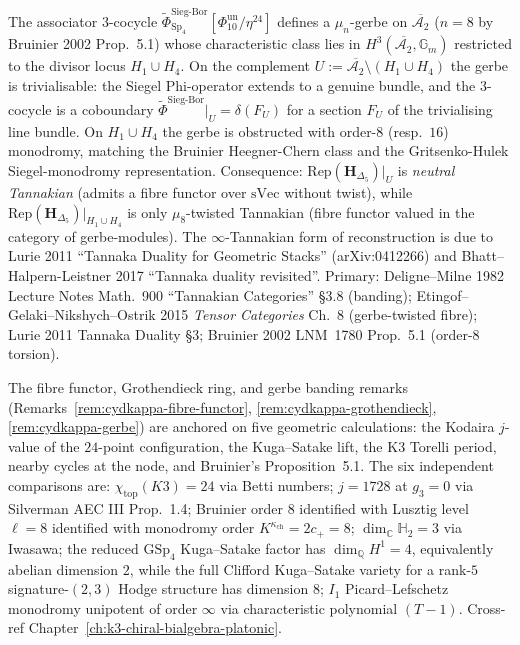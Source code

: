 \begin{remark}
\label{rem:cydkappa-gerbe}
The associator $3$-cocycle
$\widetilde{\Phi}^{\mathrm{Sieg\text{-}Bor}}_{\mathrm{Sp}_4}[\Phi_{10}^{\mathrm{un}}/\eta^{24}]$
defines a $\mu_n$-gerbe on $\overline{\mathcal A_2}$
($n = 8$ by Bruinier 2002 Prop.~5.1) whose
characteristic class lies in
$H^3(\overline{\mathcal A_2}, \mathbb{G}_m)$ restricted
to the divisor locus $H_1 \cup H_4$. On the complement
$U := \overline{\mathcal A_2}\setminus(H_1\cup H_4)$
the gerbe is trivialisable: the Siegel Phi-operator extends to a
genuine bundle, and the $3$-cocycle is a coboundary
$\widetilde{\Phi}^{\mathrm{Sieg\text{-}Bor}}|_U = \delta(F_U)$ for a
section $F_U$ of the trivialising line bundle.
On $H_1 \cup H_4$ the gerbe is obstructed with order-$8$ (resp.\ $16$)
monodromy, matching the Bruinier Heegner-Chern class and the
Gritsenko-Hulek Siegel-monodromy representation.
Consequence: $\mathrm{Rep}(\mathbf H_{\Delta_5})|_U$ is
\emph{neutral Tannakian} (admits a fibre functor over $\mathrm{sVec}$
without twist), while
$\mathrm{Rep}(\mathbf H_{\Delta_5})|_{H_1 \cup H_4}$ is only
$\mu_8$-twisted Tannakian (fibre functor valued in the category of
gerbe-modules). The $\infty$-Tannakian form of reconstruction is due
to Lurie 2011 ``Tannaka Duality for Geometric Stacks'' (arXiv:0412266)
and Bhatt--Halpern-Leistner 2017 ``Tannaka duality revisited''.
Primary: Deligne--Milne 1982 Lecture Notes Math.~900
``Tannakian Categories'' \S3.8 (banding);
Etingof--Gelaki--Nikshych--Ostrik 2015 \emph{Tensor Categories}
Ch.~8 (gerbe-twisted fibre); Lurie 2011 Tannaka Duality \S3;
Bruinier 2002 LNM~1780 Prop.~5.1 (order-$8$ torsion).
\end{remark}

\begin{remark}
\label{rem:cydkappa-compute-module}
The fibre functor, Grothendieck ring, and gerbe banding
remarks (Remarks~\ref{rem:cydkappa-fibre-functor},
\ref{rem:cydkappa-grothendieck}, \ref{rem:cydkappa-gerbe})
are anchored on five geometric calculations: the Kodaira \(j\)-value of
the \(24\)-point configuration, the Kuga--Satake lift, the K3 Torelli
period, nearby cycles at the node, and Bruinier's Proposition~5.1. The
six independent comparisons are:
$\chi_{\mathrm{top}}(K3) = 24$ via Betti numbers;
$j=1728$ at $g_3=0$ via Silverman AEC III Prop.~1.4; Bruinier order
$8$ identified with Lusztig level $\ell=8$ identified with
monodromy order $K^{\kappa_{\mathrm{ch}}} = 2 c_+ = 8$;
$\dim_{\mathbb C} \mathbb H_2 = 3$ via Iwasawa;
the reduced $\mathrm{GSp}_4$ Kuga--Satake factor has
$\dim_{\mathbb Q} H^1 = 4$, equivalently abelian dimension $2$,
while the full Clifford Kuga--Satake variety for a rank-$5$
signature-$(2,3)$ Hodge structure has dimension $8$;
$I_1$ Picard--Lefschetz monodromy unipotent of order $\infty$ via
characteristic polynomial $(T-1)$. Cross-ref
Chapter~\ref{ch:k3-chiral-bialgebra-platonic}.
\end{remark}

